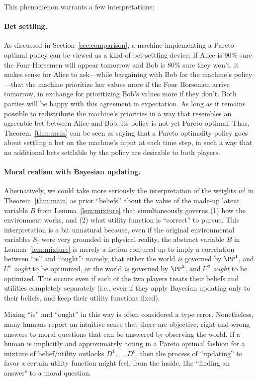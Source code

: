 \documentclass{article}  %
\newcommand{\bool}{B}
\newcommand{\lem}[1]{Lemma~\ref{lem:#1}}
\newcommand{\thm}[1]{Theorem~\ref{thm:#1}}
\newcommand{\sect}[1]{Section~\ref{sec:#1}}
\begin{document}
This phenomenon warrants a few interpretations:

\paragraph{Bet settling.}

As discussed in \sect{comparison}, a machine implementing a Pareto optimal policy can be viewed as a kind of bet-settling device.  If Alice is 90\% sure the Four Horsemen will appear tomorrow and Bob is 80\% sure they won't, it makes sense for Alice to ask---while bargaining with Bob for the machine's policy---that the machine prioritize her values more if the Four Horsemen arrive tomorrow, in exchange for prioritizing Bob's values more if they don't.  Both parties will be happy with this agreement in expectation.  As long as it remains possible to redistribute the machine's priorities in a way that resembles an agreeable bet between Alice and Bob, its policy is not yet Pareto optimal.  Thus, \thm{main} can be seen as saying that a Pareto optimality policy goes about settling a bet on the machine's input at each time step, in such a way that no additional bets settlable by the policy are desirable to both players.

\paragraph{Moral realism with Bayesian updating.}

Alternatively, we could take more seriously the interpretation of the weights $w^j$ in \thm{main} as prior ``beliefs'' about the value of the made-up latent variable $\bool $ from \lem{mixture} that simultaneously governs (1) how the environment works, and (2) what utility function is ``correct'' to pursue.  This interpretation is a bit unnatural because, even if the original environmental variables $S_i$ were very grounded in physical reality, the abstract variable $\bool $ in \lem{mixture} is merely a fiction conjured up to imply a correlation between ``is'' and ``ought'': namely, that either the world \emph{is} governed by $\PP^1$, and $U^1$ \emph{ought} to be optimized, or the world \emph{is} governed by $\PP^2$, and $U^2$ \emph{ought} to be optimized.  This occurs even if each of the two players treats their beliefs and utilities completely separately (i.e., even if they apply Bayesian updating only to their beliefs, and keep their utility functions fixed).

Mixing ``is'' and ``ought'' in this way is often considered a type error.  Nonetheless, many humans report an intuitive sense that there are objective, right-and-wrong answers to moral questions that can be answered by observing the world.  If a human is implicitly and approximately acting in a Pareto optimal fashion for a mixture of belief/utility outlooks $D^1, \ldots, D^k$, then the process of ``updating'' to favor a certain utility function might feel, from the inside, like ``finding an answer" to a moral question.
\end{document}
